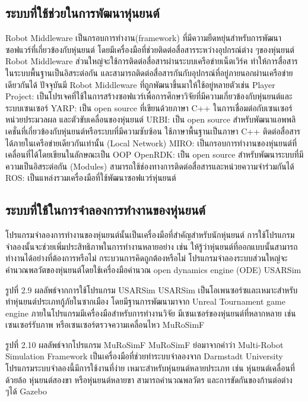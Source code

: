 \subsection{ระบบที่ใช้ช่วยในการพัฒนาหุ่นยนต์}
Robot Middleware เป็นกรอบการทำงาน(framework) ที่มีความยืดหยุ่นสำหรับการพัฒนาซอฟแวร์ที่เกี่ยวข้องกับหุ่นยนต์ โดยมีเครื่องมือที่ช่วยติดต่อสื่อสารระหว่างอุปกรณ์ต่าง ๆของหุ่นยนต์ Robot Middleware ส่วนใหญ่จะใช้การติดต่อสื่อสารผ่านระบบเครือข่ายเน็ตเวิร์ค ทำให้การสื่อสารในระบบพื้นฐานเป็นอิสระต่อกัน และสามารถติดต่อสื่อสารกันกับอุปกรณ์ที่อยู่ภายนอกผ่านเครือข่ายเดียวกันได้
ปัจจุบันมี Robot Middleware ที่ถูกพัฒนาขึ้นมาให้ใช้อยู่หลายตัวเช่น
Player Project: เป็นโปรเจคที่ใช้ในการสร้างซอฟแวร์เพื่อการศึกษาวิจัยที่มีความเกี่ยวข้องกับหุ่นยนต์และระบบเซนเซอร์
YARP: เป็น open source ที่เขียนด้วยภาษา C++ ในการเชื่อมต่อกับเซนเซอร์ หน่วยประมวลผล และตัวขับเคลื่อนของหุ่นยนต์
URBI: เป็น open source สำหรับพัฒนาแอพพลิเคชั่นที่เกี่ยวข้องกับหุ่นยนต์หรือระบบที่มีความซับซ้อน ใช้ภาษาพื้นฐานเป็นภาษา C++ ติดต่อสื่อสารได้ภายในเครือข่ายเดียวกันเท่านั้น (Local Network)
MIRO: เป็นกรอบการทำงานของหุ่นยนต์ที่เคลื่อนที่ได้โดยเขียนในลักษณะเป็น OOP
OpenRDK: เป็น open source สำหรับพัฒนาระบบที่มีความเป็นอิสระต่อกัน (Modules) สามารถใช้ช่องทางการติดต่อสื่อสารและหน่วยความจำร่วมกันได้
ROS: เป็นแหล่งรวมเครื่องมือที่ใช้พัฒนาซอฟแวร์หุ่นยนต์

\clearpage
\subsection{ระบบที่ใช้ในการจำลองการทำงานของหุ่นยนต์}
โปรแกรมจำลองการทำงานของหุ่นยนต์นั้นเป็นเครื่องมือที่สำคัญสำหรับนักหุ่นยนต์ การใช้โปรแกรมจำลองนั้นจะช่วยเพิ่มประสิทธิภาพในการทำงานหลายอย่าง เช่น ให้รู้ว่าหุ่นยนต์ที่ออกแบบนั้นสามารถทำงานได้อย่างที่ต้องการหรือไม่ กระบวนการคิดถูกต้องหรือไม่ โปรแกรมจำลองระบบส่วนใหญ่จะคำนวณพลวัตของหุ่นยนต์โดยใช้เครื่องมือคำนวณ open dynamics engine (ODE)
USARSim


รูปที่ 2.9 ผลลัพธ์จากการใช้โปรแกรม USARSim
USARSim เป็นโอเพนซอร์ซและเหมาะสำหรับทำหุ่นยนต์ประเภทกู้ภัยในซากเมือง โดยมีฐานการพัฒนามาจาก Unreal Tournament game engine ภายในโปรแกรมมีเครื่องมือสำหรับการทำงานวิจัย มีเซนเซอร์ของหุ่นยนต์ที่หลากหลาย เช่น เซนเซอร์รับภาพ หรือเซนเซอร์ตรวจความเคลื่อนไหว
MuRoSimF

รูปที่ 2.10 ผลลัพธ์จากโปรแกรม MuRoSimF
MuRoSimF ย่อมาจากคำว่า Multi-Robot Simulation Framework เป็นเครื่องมือที่ช่วยทำระบบจำลองจาก Darmstadt University โปรแกรมระบบจำลองนี้มีการใช้งานที่ง่าย เหมาะสำหรับหุ่นยนต์หลายประเภท เช่น หุ่นยนต์เคลื่อนที่ด้วยล้อ หุ่นยนต์สองขา หรือหุ่นยนต์หลายขา สามารถคำนวณพลวัตร และการขัดกันของก้านต่อต่าง ๆได้
Gazebo

